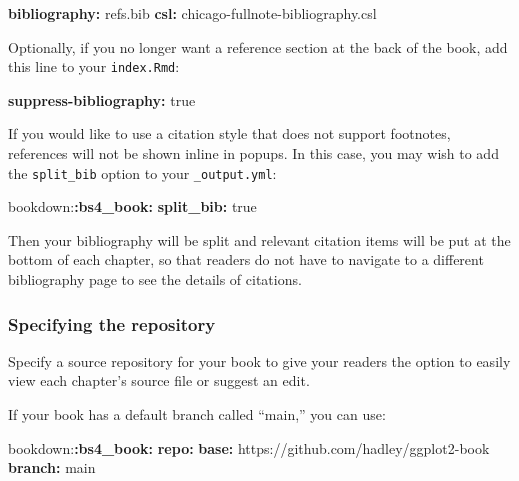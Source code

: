 \documentclass[
  12pt,
]{krantz}
\newenvironment{Shaded}{\begin{snugshade}}{\end{snugshade}}
\newcommand{\AttributeTok}[1]{\textcolor[rgb]{0.13,0.29,0.53}{#1}}
\newcommand{\CharTok}[1]{\textcolor[rgb]{0.31,0.60,0.02}{#1}}
\newcommand{\FunctionTok}[1]{\textcolor[rgb]{0.13,0.29,0.53}{\textbf{#1}}}
\newcommand{\KeywordTok}[1]{\textcolor[rgb]{0.13,0.29,0.53}{\textbf{#1}}}
\theoremstyle{definition}
\theoremstyle{definition}
\theoremstyle{definition}
\theoremstyle{definition}
\theoremstyle{remark}
\begin{document}
\begin{Shaded}
\begin{Highlighting}[]
\FunctionTok{bibliography}\KeywordTok{:}\AttributeTok{ refs.bib}
\FunctionTok{csl}\KeywordTok{:}\AttributeTok{ chicago{-}fullnote{-}bibliography.csl}
\end{Highlighting}
\end{Shaded}

Optionally, if you no longer want a reference section
at the back of the book, add this line to your \texttt{index.Rmd}:

\begin{Shaded}
\begin{Highlighting}[]
\FunctionTok{suppress{-}bibliography}\KeywordTok{:}\AttributeTok{ }\CharTok{true}
\end{Highlighting}
\end{Shaded}

If you would like to use a citation style that does not support footnotes, references will not be shown inline in popups. In this case, you may wish to add the \texttt{split\_bib} option to your \texttt{\_output.yml}:

\begin{Shaded}
\begin{Highlighting}[]
\AttributeTok{bookdown:}\FunctionTok{:bs4\_book}\KeywordTok{:}
\AttributeTok{  }\FunctionTok{split\_bib}\KeywordTok{:}\AttributeTok{ }\CharTok{true}
\end{Highlighting}
\end{Shaded}

Then your bibliography will be split and relevant citation items will be put at the bottom of each chapter, so that readers do not have to navigate to a different bibliography page to see the details of citations.

\subsubsection{Specifying the repository}\label{specifying-the-repository}

Specify a source repository for your book to give your readers the option to easily view each chapter's source file or suggest an edit.

If your book has a default branch called ``main,'' you can use:

\begin{Shaded}
\begin{Highlighting}[]
\AttributeTok{bookdown:}\FunctionTok{:bs4\_book}\KeywordTok{:}
\AttributeTok{  }\FunctionTok{repo}\KeywordTok{:}
\AttributeTok{    }\FunctionTok{base}\KeywordTok{:}\AttributeTok{ https://github.com/hadley/ggplot2{-}book}
\AttributeTok{    }\FunctionTok{branch}\KeywordTok{:}\AttributeTok{ main}
\end{Highlighting}
\end{Shaded}
\end{document}
